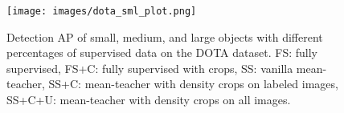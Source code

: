 \begin{comment}
\begin{table*}
    \centering
    \begin{tabular}{l||rrr|rrr|rrr|r}
    \hline
    \textbf{Settings} & \multicolumn{3}{|c|}{1\% (\#L=64)} & \multicolumn{3}{|c|}{5\% (\#L=323)} & \multicolumn{3}{|c|}{10\% (\#L=647)} & FPS\\
    \hline
     & \textbf{AP} & \textbf{$\textrm{AP}_{50}$} & \textbf{$\textrm{AP}_{75}$} &  \textbf{AP} & \textbf{$\textrm{AP}_{50}$} & \textbf{$\textrm{AP}_{75}$} & \textbf{AP} & \textbf{$\textrm{AP}_{50}$} & \textbf{$\textrm{AP}_{75}$} &  \\
     \hline
     Supervised & 5.56 & 12.39 & 3.92 & 14.55 & 25.52 & 14.27 & 19.18 & 34.44 & 18.40 & 0.50 \\
     Supervised + Dcrop & 6.80 & 14.19 & 5.51 & 15.97 & 28.98 & 15.74 & 20.43 & 36.50 & 20.27 & 0.92 \\
     \hline
     SSOD & 8.78 & 16.18 & 8.25 & 16.78 & 29.59 & 16.11 & 23.15 & 39.49 & 23.86 & 0.50 \\
     SSOD + Dcrop (L) & 9.74 & 18.44 & 8.96 & 18.42 & 31.62 & 18.26 &  24.34 & 42.30 & 24.29 & 0.92 \\
     SSOD + Dcrop (L + U) & \textbf{10.32} & \textbf{19.70} & \textbf{9.33} & \textbf{19.96} & \textbf{34.78} & \textbf{19.65} & \textbf{25.17} & \textbf{43.07} & \textbf{24.57} & 0.92\\
    \hline  
    \end{tabular}
    \caption{Performance comparison of our density crop guided semi-supervised object detection with 1\%, 5\%, and 10\% labeled images on the DOTA dataset. The detection speed is also reported in FPS. SSOD - semi-supervised detection with mean-teacher, Dcrop(L) - density crops on the labeled images, Dcrop (L + U) - density crops on the labeled and unlabeled images.}
    \label{table:diff_sup_data_dota}
\end{table*}
\end{comment}

\begin{figure}[t]
  \centering
  \texttt{[image: images/dota\_sml\_plot.png]} 
  \caption{Detection AP of small, medium, and large objects with different percentages of supervised data on the DOTA dataset. FS: fully supervised, FS+C: fully supervised with crops, SS: vanilla mean-teacher, SS+C: mean-teacher with density crops on labeled images, SS+C+U: mean-teacher with density crops on all images.}
  \label{fig:dota_sml}
\end{figure}


